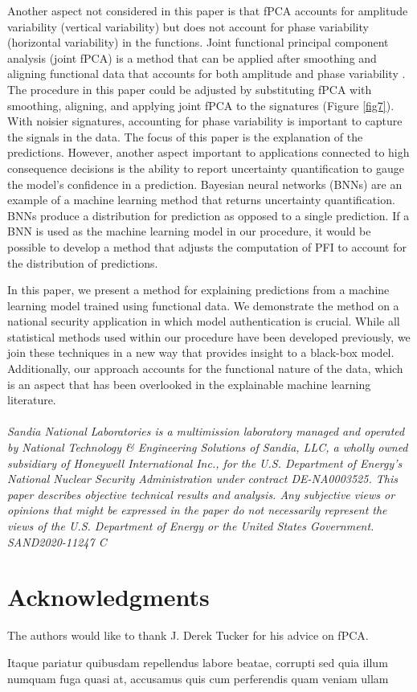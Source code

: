 \documentclass[letterpaper]{article}
\begin{document}
Another aspect not considered in this paper is that fPCA accounts for amplitude variability (vertical variability) but does not account for phase variability (horizontal variability) in the functions. Joint functional principal component analysis (joint fPCA) is a method that can be applied after smoothing and aligning functional data that accounts for both amplitude and phase variability \cite{lee:2017,tucker:2013}. The procedure in this paper could be adjusted by substituting fPCA with smoothing, aligning, and applying joint fPCA to the signatures (Figure \ref{fig7}). With noisier signatures, accounting for phase variability is important to capture the signals in the data.  The focus of this paper is the explanation of the predictions. However, another aspect important to applications connected to high consequence decisions is the ability to report uncertainty quantification to gauge the model's confidence in a prediction. Bayesian neural networks (BNNs) are an example of a machine learning method that returns uncertainty quantification. BNNs produce a distribution for prediction as opposed to a single prediction. If a BNN is used as the machine learning model in our procedure, it would be possible to develop a method that adjusts the computation of PFI to account for the distribution of predictions.

In this paper, we present a method for explaining predictions from a machine learning model trained using functional data. We demonstrate the method on a national security application in which model authentication is crucial. While all statistical methods used within our procedure have been developed previously, we join these techniques in a new way that provides insight to a black-box model. Additionally, our approach accounts for the functional nature of the data, which is an aspect that has been overlooked in the explainable machine learning literature.\\
\\
\textit{Sandia National Laboratories is a multimission laboratory managed and operated by National Technology \& Engineering Solutions of Sandia, LLC, a wholly owned subsidiary of Honeywell International Inc., for the U.S. Department of Energy's National Nuclear Security Administration under contract DE-NA0003525. This paper describes objective technical results and analysis. Any subjective views or opinions that might be expressed in the paper do not necessarily represent the views of the U.S. Department of Energy or the United States Government. SAND2020-11247 C}

\vspace{-1.06mm}
\vspace{-1.84mm}
\section*{Acknowledgments}

The authors would like to thank J. Derek Tucker for his advice on fPCA.

  Itaque pariatur quibusdam repellendus labore beatae, corrupti sed quia illum numquam fuga quasi at, accusamus quis cum perferendis quam veniam ullam

\end{document}
